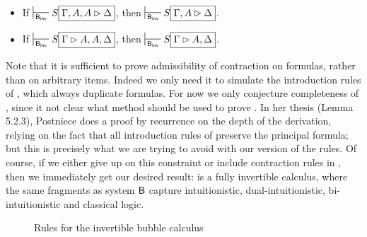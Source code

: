 \begin{lemma}
  ~\\\vspace{-1em}
  \begin{itemize}
    \item If $\prov{\msys{B_{inv}}} S\select{\Gamma, A, A \J \Delta}$, then
    $\prov{\msys{B_{inv}}} S\select{\Gamma, A \J \Delta}$.
    \item If $\prov{\msys{B_{inv}}} S\select{\Gamma \J A, A, \Delta}$, then
    $\prov{\msys{B_{inv}}} S\select{\Gamma \J A, \Delta}$.
  \end{itemize}
\end{lemma}

Note that it is sufficient to prove admissibility of contraction on formulas,
rather than on arbitrary items. Indeed we only need it to simulate the
introduction rules of , which always duplicate formulas. For now we
only conjecture completeness of , since it not clear what method
should be used to prove . In her thesis
\cite{postniece_proof_2010} (Lemma 5.2.3), Postniece does a proof by recurrence
on the depth of the derivation, relying on the fact that all introduction rules
of  preserve the principal formula; but this is precisely what we
are trying to avoid with our version of the rules. Of course, if we either give
up on this constraint or include contraction rules in , then we
immediately get our desired result:  is a fully invertible
calculus, where the same fragments as system $\sysB$ capture intuitionistic,
dual-intuitionistic, bi-intuitionistic and classical logic.



\begin{figure*}
  
  \caption{Rules for the invertible bubble calculus }
\end{figure*}